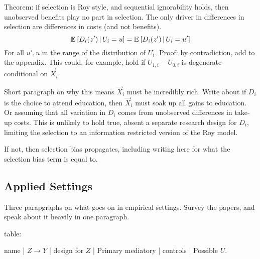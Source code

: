 Theorem: if selection is Roy style, and sequential ignorability holds, then unobserved benefits play no part in selection.
The only driver in differences in selection are differences in costs (and not benefits).
\[ \mathbb{E}_{} \left[  D_i(z')  \, \middle\vert \,  U_i = u \right] = \mathbb{E}_{} \left[  D_i(z')  \, \middle\vert \,  U_i = u' \right] \]
For all $u', u$ in the range of the distribution of $U_i$.
Proof: by contradiction, add to the appendix.
This could, for example, hold if $U_{1,i} - U_{0,i}$ is degenerate conditional on $\vec X_i$.

Short paragraph on why this means $\vec X_i$ must be incredibly rich.
Write about if $D_i$ is the choice to attend education, then $\vec X_i$ must soak up all gains to education.
Or assuming that all variation in $D_i$ comes from unobserved differences in take-up costs.
This is unlikely to hold true, absent a separate research design for $D_i$, limiting the selection to an information restricted version of the Roy model.

If not, then selection bias propagates, including writing here for what the selection bias term is equal to. 

\subsection{Applied Settings}

Three parapgraphs on what goes on in empirical settings.
Survey the papers, and speak about it heavily in one paragraph.

table:

name | $Z \to Y$ | design for $Z$ | Primary mediatory | controls | Possible $U$.
